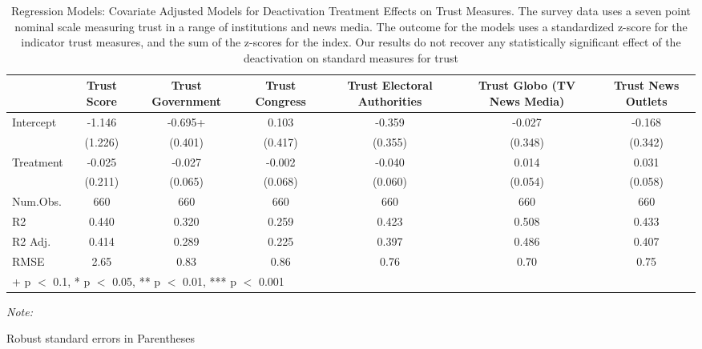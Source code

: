 \begin{table}

\caption{Regression Models: Covariate Adjusted Models for Deactivation Treatment Effects on Trust Measures. The survey data uses a seven point nominal scale measuring trust in a range of institutions and news media.  The outcome for the models uses a standardized z-score for the indicator trust measures, and the sum of the z-scores for the index. Our results do not recover any statistically significant effect of the deactivation on standard measures for trust}
\centering
\begin{threeparttable}
\begin{tabular}[t]{lcccccc}
\toprule
  & Trust Score & Trust Government & Trust Congress & Trust Electoral Authorities & Trust Globo (TV News Media) & Trust News Outlets\\
\midrule
Intercept & -1.146 & -0.695+ & 0.103 & -0.359 & -0.027 & -0.168\\
 & (1.226) & (0.401) & (0.417) & (0.355) & (0.348) & (0.342)\\
Treatment & -0.025 & -0.027 & -0.002 & -0.040 & 0.014 & 0.031\\
 & (0.211) & (0.065) & (0.068) & (0.060) & (0.054) & (0.058)\\
\midrule
Num.Obs. & 660 & 660 & 660 & 660 & 660 & 660\\
R2 & 0.440 & 0.320 & 0.259 & 0.423 & 0.508 & 0.433\\
R2 Adj. & 0.414 & 0.289 & 0.225 & 0.397 & 0.486 & 0.407\\
RMSE & 2.65 & 0.83 & 0.86 & 0.76 & 0.70 & 0.75\\
\bottomrule
\multicolumn{7}{l}{\rule{0pt}{1em}+ p $<$ 0.1, * p $<$ 0.05, ** p $<$ 0.01, *** p $<$ 0.001}\\
\end{tabular}
\begin{tablenotes}
\item \textit{Note: } 
\item Robust standard errors in Parentheses
\end{tablenotes}
\end{threeparttable}
\end{table}
